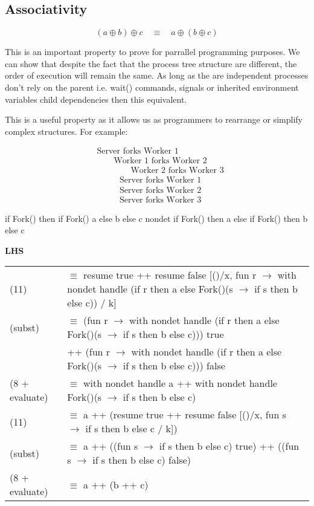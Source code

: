 \documentclass[logo,bsc,singlespacing,parskip]{infthesis}
\begin{document}
\subsection*{Associativity}

\[
(a \oplus b) \oplus c \quad \equiv \quad a \oplus (b \oplus c)
\]

This is an important property to prove for parrallel programming purposes. We can show that despite the fact that the process tree structure are different, the order of execution will remain the same. As long as the are independent processes don't rely on the parent i.e. wait() commands, signals or inherited environment variables child dependencies then this equivalent.

This is a useful property as it allows us as programmers to rearrange or simplify complex structures.
For example:

\[
\begin{aligned}
    &\text{Server forks Worker 1} \\
    &\quad\quad \text{Worker 1 forks Worker 2} \\
    &\quad\quad\quad\quad \text{Worker 2 forks Worker 3}
\end{aligned}
\]
\[
\begin{aligned}
    &\text{Server forks Worker 1} \\
    &\text{Server forks Worker 2} \\
    &\text{Server forks Worker 3}
\end{aligned}
\]



{
if Fork() then
if Fork() 
a 
else 
b 
else 
c
}
{nondet}
{
if Fork() then a 
else 
if Fork() 
 then b 
 else c
}

\noindent\textbf{LHS}
\begin{flushleft}
\renewcommand{\arraystretch}{1.3} %
\begin{tabularx}{\textwidth}{l X}
    (11) & $\equiv$ resume true ++ resume false [()/x, fun r $\rightarrow$ with nondet handle (if r then a else Fork()(s $\rightarrow$ if s then b else c)) / k] \\
    (subst) & $\equiv$ (fun r $\rightarrow$ with nondet handle (if r then a else Fork()(s $\rightarrow$ if s then b else c))) true \\
            & \quad ++ (fun r $\rightarrow$ with nondet handle (if r then a else Fork()(s $\rightarrow$ if s then b else c))) false \\
    (8 + evaluate) & $\equiv$ with nondet handle a ++ with nondet handle Fork()(s $\rightarrow$ if s then b else c) \\
    (11) & $\equiv$ a ++ (resume true ++ resume false [()/x, fun s $\rightarrow$ if s then b else c / k]) \\
    (subst) & $\equiv$ a ++ ((fun s $\rightarrow$ if s then b else c) true) ++ ((fun s $\rightarrow$ if s then b else c) false) \\
    (8 + evaluate) & $\equiv$ a ++ (b ++ c)
\end{tabularx}
\end{flushleft}
\end{document}
